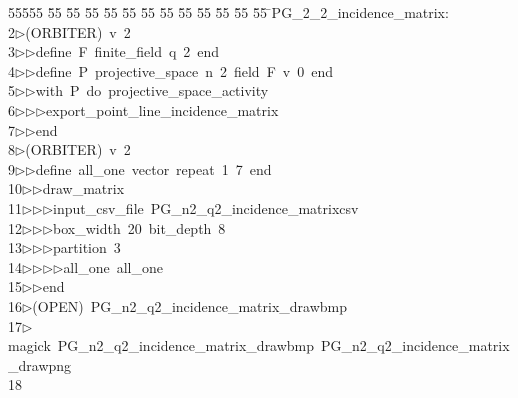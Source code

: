 %
%
\begin{tabbing}
55555 \= 55 \= 55 \= 55 \= 55 \= 55 \= 55 \= 55 \= 55 \= 55 \= 55 \= 55 \= 55 \= \>PG\_2\_2\_incidence\_matrix:\\[0pt]
2\>$\triangleright$\>(ORBITER)\ v\ 2\ \\[0pt]
3\>$\triangleright$\>$\triangleright$\>define\ F\ finite\_field\ q\ 2\ end\ \\[0pt]
4\>$\triangleright$\>$\triangleright$\>define\ P\ projective\_space\ n\ 2\ field\ F\ v\ 0\ end\ \\[0pt]
5\>$\triangleright$\>$\triangleright$\>with\ P\ do\ projective\_space\_activity\ \\[0pt]
6\>$\triangleright$\>$\triangleright$\>$\triangleright$\>export\_point\_line\_incidence\_matrix\ \\[0pt]
7\>$\triangleright$\>$\triangleright$\>end\\[0pt]
8\>$\triangleright$\>(ORBITER)\ v\ 2\ \\[0pt]
9\>$\triangleright$\>$\triangleright$\>define\ all\_one\ vector\ repeat\ 1\ 7\ end\ \\[0pt]
10\>$\triangleright$\>$\triangleright$\>draw\_matrix\ \\[0pt]
11\>$\triangleright$\>$\triangleright$\>$\triangleright$\>input\_csv\_file\ PG\_n2\_q2\_incidence\_matrixcsv\ \\[0pt]
12\>$\triangleright$\>$\triangleright$\>$\triangleright$\>box\_width\ 20\ bit\_depth\ 8\ \\[0pt]
13\>$\triangleright$\>$\triangleright$\>$\triangleright$\>partition\ 3\ \\[0pt]
14\>$\triangleright$\>$\triangleright$\>$\triangleright$\>$\triangleright$\>all\_one\ all\_one\ \\[0pt]
15\>$\triangleright$\>$\triangleright$\>end\\[0pt]
16\>$\triangleright$\>(OPEN)\ PG\_n2\_q2\_incidence\_matrix\_drawbmp\\[0pt]
17\>$\triangleright$\>magick\ PG\_n2\_q2\_incidence\_matrix\_drawbmp\ PG\_n2\_q2\_incidence\_matrix\_drawpng\\[0pt]
18\>\end{tabbing}
